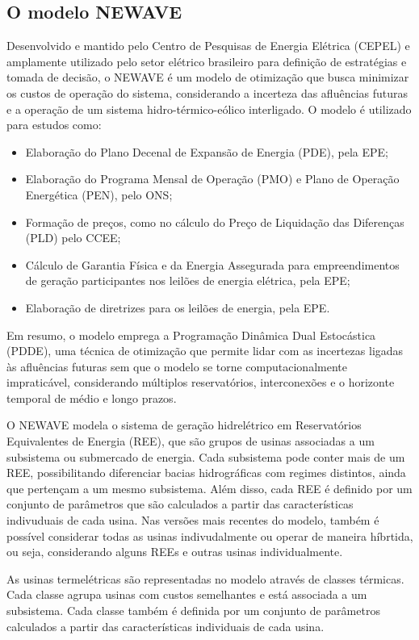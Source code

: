 \subsection{O modelo NEWAVE}
\label{sec:newave}

Desenvolvido e mantido pelo Centro de Pesquisas de Energia Elétrica (CEPEL) e amplamente utilizado pelo setor elétrico 
brasileiro para definição de estratégias e tomada de decisão, o NEWAVE é um modelo de otimização que busca minimizar os 
custos de operação do sistema, considerando a incerteza das afluências futuras e a operação de um sistema 
hidro-térmico-eólico interligado. O modelo é utilizado para estudos como:
\begin{itemize}
	\item Elaboração do Plano Decenal de Expansão de Energia (PDE), pela EPE;
	\item Elaboração do Programa Mensal de Operação (PMO) e Plano de Operação Energética (PEN), pelo ONS;
	\item Formação de preços, como no cálculo do Preço de Liquidação das Diferenças (PLD) pelo CCEE;
	\item Cálculo de Garantia Física e da Energia Assegurada para empreendimentos de geração participantes nos leilões de energia elétrica, pela EPE;
	\item Elaboração de diretrizes para os leilões de energia, pela EPE.
\end{itemize}

Em resumo, o modelo emprega a Programação Dinâmica Dual Estocástica (PDDE), uma técnica de otimização que permite lidar 
com as incertezas ligadas às afluências futuras sem que o modelo se torne computacionalmente impraticável, considerando 
múltiplos reservatórios, interconexões e o horizonte temporal de médio e longo prazos.

O NEWAVE modela o sistema de geração hidrelétrico em Reservatórios Equivalentes de Energia (REE), que são grupos de
usinas associadas a um subsistema ou submercado de energia. Cada subsistema pode conter mais de um REE, possibilitando
diferenciar bacias hidrográficas com regimes distintos, ainda que pertençam a um mesmo subsistema. Além disso, cada REE
é definido por um conjunto de parâmetros que são calculados a partir das características indivuduais de cada usina. Nas
versões mais recentes do modelo, também é possível considerar todas as usinas indivudalmente ou operar de maneira
híbrtida, ou seja, considerando alguns REEs e outras usinas individualmente.

As usinas termelétricas são representadas no modelo através de classes térmicas. Cada classe agrupa usinas com custos 
semelhantes e está associada a um subsistema. Cada classe também é definida por um conjunto de parâmetros calculados
a partir das características individuais de cada usina.

